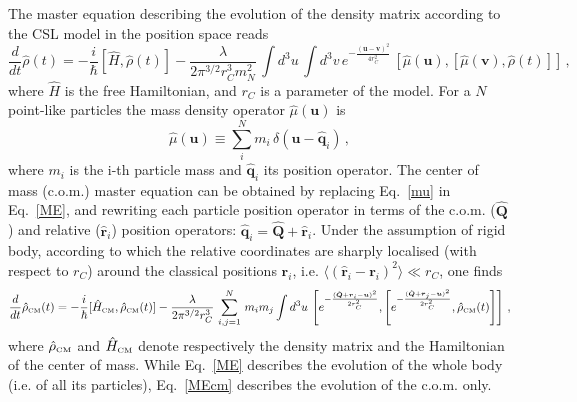 \documentclass[11pt,onecolumn,amssymb,nofootinbib]{revtex4}
\newcommand\beq{\begin{equation}}
\newcommand\eeq{\end{equation}}
\newcommand\ro{\hat\rho}
\newcommand\Ho{\hat H}
\newcommand\Mo{\hat M}
\newcommand\br{\boldsymbol{r}}
\newcommand\bv{\boldsymbol{v}}
\newcommand\bqo{\hat{\boldsymbol{q}}}
\newcommand\bro{\hat{\boldsymbol{r}}}
\newcommand\bQo{\hat{\boldsymbol{Q}}}
\begin{document}
The master equation describing the evolution of the density matrix according to the CSL model in the position space reads~\cite{CSL,rep1,rep2}
\begin{equation}\label{ME}
\frac{d}{dt}\hat{\rho}(t)=-\frac{i}{\hbar}[\Ho,\ro(t)]-\frac{\lambda}{2\pi^{3/2} r_C^3m_N^2}\,\int d^3u\,\int d^3v\,e^{-\frac{(\boldsymbol{u}-\boldsymbol{v})^2}{4r_C^2}} \, [\hat{\mu}(\boldsymbol{u}),[\hat{\mu}(\boldsymbol{v}),\hat{\rho}(t)]]\,,
\end{equation}
where $\Ho$ is the free Hamiltonian, and $r_C$ is a parameter of the model. %
 For a $N$ point-like particles the mass density operator $\hat{\mu}(\boldsymbol{u})$ is
 \beq\label{mu}
\hat{\mu}(\boldsymbol{u})\equiv \sum_i^N m_i\,\delta(\boldsymbol{u}-\hat{\boldsymbol{q}}_i)\,,
\eeq
where $m_i$ is the i-th particle mass and $\hat{\boldsymbol{q}}_i$ its position operator.
The center of mass (c.o.m.) master equation can be obtained by replacing Eq.~\eqref{mu} in Eq.~\eqref{ME}, and rewriting each particle position operator in terms of the c.o.m. ($\bQo$) and relative ($\bro_i$) position operators: $\bqo_i=\bQo+\bro_i$. Under the assumption of rigid body, according to which the relative coordinates are sharply localised (with respect to $r_C$) around the classical positions $\br_i$, i.e. $\langle(\bro_i-\br_i)^2\rangle\ll r_C$, one finds
\begin{equation}\label{MEcm}
\frac{d}{dt}\hat{\rho}_{\text{\tiny{CM}}}(t)=-\frac{i}{\hbar}[\Ho_{\text{\tiny{CM}}},\ro_{\text{\tiny{CM}}}(t)]-\frac{\lambda}{2\pi^{3/2} r_C^3}\,\sum_{i,j=1}^N\,m_im_j\int d^3u\, \left[e^{-\frac{(\bQo+\br_i-\boldsymbol{u})^2}{2r_C^2}},\left[e^{-\frac{(\bQo+\br_j-\boldsymbol{u})^2}{2r_C^2}},\hat{\rho}_{\text{\tiny{CM}}}(t)\right]\right]\,,
\end{equation}
where $\hat{\rho}_{\text{\tiny{CM}}}$ and $\Ho_{\text{\tiny{CM}}}$ denote respectively the density matrix and the Hamiltonian of the center of mass.
While Eq.~\eqref{ME} describes the evolution of the whole body (i.e. of all its particles), Eq.~\eqref{MEcm} describes the evolution of the c.o.m. only.
\end{document}
